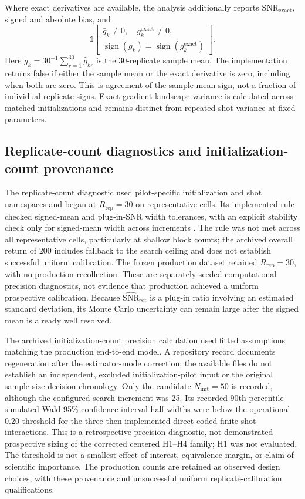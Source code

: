 \documentclass[pdflatex,sn-mathphys-num,Numbered]{sn-jnl}
\newcommand{\snrest}{\widehat{\mathrm{SNR}}_{\mathrm{est}}}
\newcommand{\snrexact}{\mathrm{SNR}_{\mathrm{exact}}}
\begin{document}
Where exact derivatives are available, the analysis additionally reports $\snrexact$, signed and absolute bias, and
\[
\mathbb{1}\!\left[\begin{gathered}
\bar g_k\ne0,\quad g_k^{\mathrm{exact}}\ne0,\\
\operatorname{sign}(\bar g_k)=\operatorname{sign}(g_k^{\mathrm{exact}})
\end{gathered}\right].
\]
Here $\bar g_k=30^{-1}\sum_{r=1}^{30}\hat g_{kr}$ is the 30-replicate sample mean. The implementation returns false if either the sample mean or the exact derivative is zero, including when both are zero. This is agreement of the sample-mean sign, not a fraction of individual replicate signs. Exact-gradient landscape variance is calculated across matched initializations and remains distinct from repeated-shot variance at fixed parameters.

\subsection{Replicate-count diagnostics and initialization-count provenance}
\label{sec:calibration}

The replicate-count diagnostic used pilot-specific initialization and shot namespaces and began at $R_{\mathrm{rep}}=30$ on representative cells. Its implemented rule checked signed-mean and plug-in-SNR width tolerances, with an explicit stability check only for signed-mean width across increments \cite{davison1997bootstrap,tamiya2022stochastic}. The rule was not met across all representative cells, particularly at shallow block counts; the archived overall return of 200 includes fallback to the search ceiling and does not establish successful uniform calibration. The frozen production dataset retained $R_{\mathrm{rep}}=30$, with no production recollection. These are separately seeded computational precision diagnostics, not evidence that production achieved a uniform prospective calibration. Because $\snrest$ is a plug-in ratio involving an estimated standard deviation, its Monte Carlo uncertainty can remain large after the signed mean is already well resolved.

The archived initialization-count precision calculation used fitted assumptions matching the production end-to-end model. A repository record documents regeneration after the estimator-mode correction; the available files do not establish an independent, excluded initialization-pilot input or the original sample-size decision chronology. Only the candidate $N_{\mathrm{init}}=50$ is recorded, although the configured search increment was 25. Its recorded 90th-percentile simulated Wald 95\% confidence-interval half-widths were below the operational 0.20 threshold for the three then-implemented direct-coded finite-shot interactions. This is a retrospective precision diagnostic, not demonstrated prospective sizing of the corrected centered H1--H4 family; H1 was not evaluated. The threshold is not a smallest effect of interest, equivalence margin, or claim of scientific importance. The production counts are retained as observed design choices, with these provenance and unsuccessful uniform replicate-calibration qualifications.
\end{document}
